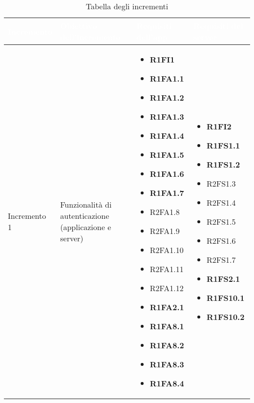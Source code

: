 {
\renewcommand{\arraystretch}{2}
\centering
	
\begin{longtable}{C{3cm} C{4cm} C{4cm} C{4cm}}
\caption{Tabella degli incrementi}\\
\textcolor{white}{\textbf{Incremento}} &
\textcolor{white}{\textbf{Obiettivo dell'incremento}} & 
\textcolor{white}{\textbf{Requisiti dell'app}} &
\textcolor{white}{\textbf{Requisiti del server}}\\
\endhead

Incremento 1 & Funzionalità di autenticazione (applicazione e server) & \begin{itemize}
    \item[ ] \textbf{R1FI1}
    \item[ ] \textbf{R1FA1.1}
    \item[ ] \textbf{R1FA1.2}
    \item[ ] \textbf{R1FA1.3}
    \item[ ] \textbf{R1FA1.4}
    \item[ ] \textbf{R1FA1.5}
    \item[ ] \textbf{R1FA1.6}
    \item[ ] \textbf{R1FA1.7}
    \item[ ] R2FA1.8
    \item[ ] R2FA1.9
    \item[ ] R2FA1.10
    \item[ ] R2FA1.11
    \item[ ] R2FA1.12 
    \item[ ] \textbf{R1FA2.1}
    \item[ ] \textbf{R1FA8.1}
    \item[ ] \textbf{R1FA8.2}
    \item[ ] \textbf{R1FA8.3}
    \item[ ] \textbf{R1FA8.4}
\end{itemize} & \begin{itemize} 
    \item[ ] \textbf{R1FI2}
    \item[ ] \textbf{R1FS1.1}
    \item[ ] \textbf{R1FS1.2}
    \item[ ] R2FS1.3
    \item[ ] R2FS1.4
    \item[ ] R2FS1.5
    \item[ ] R2FS1.6
    \item[ ] R2FS1.7
    \item[ ] \textbf{R1FS2.1}
    \item[ ] \textbf{R1FS10.1}
    \item[ ] \textbf{R1FS10.2}
\end{itemize}\\


\end{longtable}}
